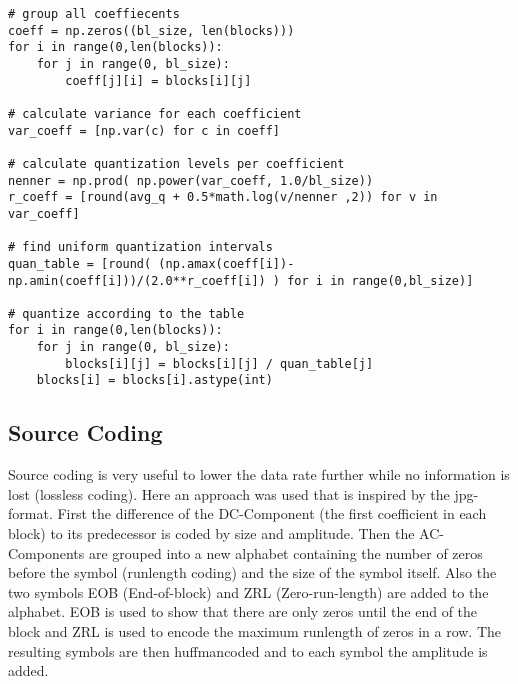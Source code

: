 \documentclass[10pt]{article}
\begin{document}
\begin{lstlisting}
# group all coeffiecents
coeff = np.zeros((bl_size, len(blocks)))
for i in range(0,len(blocks)):
	for j in range(0, bl_size):
		coeff[j][i] = blocks[i][j]

# calculate variance for each coefficient
var_coeff = [np.var(c) for c in coeff]

# calculate quantization levels per coefficient 
nenner = np.prod( np.power(var_coeff, 1.0/bl_size))
r_coeff = [round(avg_q + 0.5*math.log(v/nenner ,2)) for v in var_coeff]

# find uniform quantization intervals  
quan_table = [round( (np.amax(coeff[i])- np.amin(coeff[i]))/(2.0**r_coeff[i]) ) for i in range(0,bl_size)]

# quantize according to the table
for i in range(0,len(blocks)):
	for j in range(0, bl_size):
		blocks[i][j] = blocks[i][j] / quan_table[j]
	blocks[i] = blocks[i].astype(int)
\end{lstlisting}


\subsection{Source Coding}
Source coding is very useful to lower the data rate further while no information is lost (lossless coding).
Here an approach was used that is inspired by the jpg-format.
First the difference of the DC-Component (the first coefficient in each block) to its predecessor is coded by size and amplitude.
Then the AC-Components are grouped into a new alphabet containing the number of zeros before the symbol (runlength coding) and the size of the symbol itself.
Also the two symbols EOB (End-of-block) and ZRL (Zero-run-length) are added to the alphabet.
EOB is used to show that there are only zeros until the end of the block and ZRL is used to encode the maximum runlength of zeros in a row.
The resulting symbols are then huffmancoded and to each symbol the amplitude is added.
\end{document}

